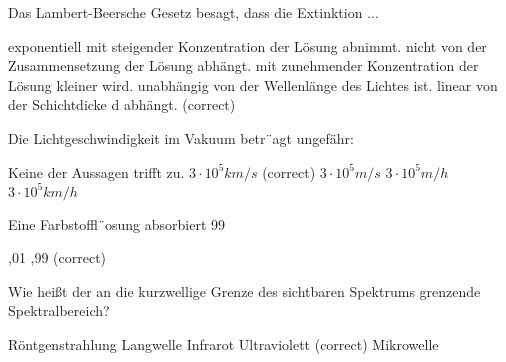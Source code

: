 \documentclass[11pt]{exam}
\begin{document}
\setlength{\voffset}{-0.5in}
\setlength{\headsep}{5pt}

\hspace{2mm}
 \hspace{5mm}
\vspace{4mm}

\begin{questions}

\question Das Lambert-Beersche Gesetz besagt, dass die Extinktion ...

\begin{choices}
	\choice exponentiell mit steigender Konzentration der Lösung abnimmt.
	\choice nicht von der Zusammensetzung der Lösung abhängt.
	\choice mit zunehmender Konzentration der Lösung kleiner wird.
	\choice unabhängig von der Wellenlänge des Lichtes ist.
	\choice linear von der Schichtdicke d abhängt. (correct)
\end{choices}

\vspace{3mm}\question Die Lichtgeschwindigkeit im Vakuum betr¨agt ungefähr:

\begin{choices}
	\choice Keine der Aussagen trifft zu.
	\choice \( 3 \cdot10^5 km/s \) (correct)
	\choice \( 3 \cdot10^5 m/s \)
	\choice \( 3 \cdot10^5 m/h \)
	\choice \( 3 \cdot10^5 km/h \)
\end{choices}

\vspace{3mm}\question Eine Farbstoffl¨osung absorbiert 99 %

\begin{choices}
	,01
	,99
	 (correct)
\end{choices}

\vspace{3mm}\question Wie heißt der an die kurzwellige Grenze des sichtbaren Spektrums grenzende Spektralbereich?

\begin{choices}
	\choice Röntgenstrahlung
	\choice Langwelle
	\choice Infrarot
	\choice Ultraviolett (correct)
	\choice Mikrowelle
\end{choices}


\end{questions}
\end{document}
